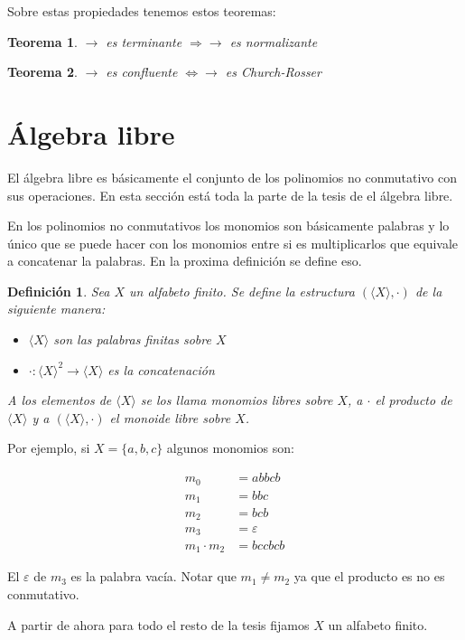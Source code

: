 \documentclass{report}
\theoremstyle{customstyle}
\newtheorem{definition}{Definición}[chapter]
\newtheorem{theorem}{Teorema}[chapter]
\theoremstyle{factstyle}
\begin{document}
Sobre estas propiedades tenemos estos teoremas:

\begin{theorem}\label{thm:terminante ⇒ normalizante}
  $→$ es terminante $⇒ →$ es normalizante
\end{theorem}

\begin{theorem}\label{thm:confluente ⇔ Church-Rosser}
  $→$ es confluente $⇔ →$ es Church-Rosser
\end{theorem}

\section{Álgebra libre}

El álgebra libre es básicamente el conjunto de los polinomios no conmutativo con sus operaciones. En esta sección está toda la parte de la tesis de el álgebra libre.

En los polinomios no conmutativos los monomios son básicamente palabras y lo único que se puede hacer con los monomios entre si es multiplicarlos que equivale a concatenar la palabras. En la proxima definición se define eso.

\begin{definition}
  Sea $X$ un alfabeto finito. Se define la estructura $(⟨X⟩, ·)$ de la siguiente manera:
  \begin{itemize}
    \item $⟨X⟩$ son las palabras finitas sobre $X$
    \item $· : ⟨X⟩^2 → ⟨X⟩$ es la concatenación
  \end{itemize}
  A los elementos de $⟨X⟩$ se los llama monomios libres sobre $X$, a $·$ el producto de $⟨X⟩$ y a $(⟨X⟩, ·)$ el monoide libre sobre $X$.
\end{definition}

Por ejemplo, si $X = \{a, b, c\}$ algunos monomios son:

\begin{align*}
  m_0 &= abbcb \\
  m_1 &= bbc \\
  m_2 &= bcb \\
  m_3 &= ε \\
  m_1 · m_2 &= bccbcb
\end{align*}

El $ε$ de $m_3$ es la palabra vacía. Notar que $m_1 ≠ m_2$ ya que el producto es no es conmutativo.

A partir de ahora para todo el resto de la tesis fijamos $X$ un alfabeto finito.
\end{document}
